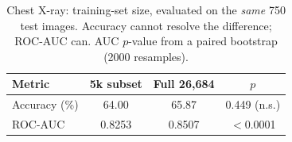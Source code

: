 \begin{table}[t]
\centering
\caption{Chest X-ray: training-set size, evaluated on the \emph{same} 750 test images. Accuracy cannot resolve the difference; ROC-AUC can. AUC $p$-value from a paired bootstrap (2000 resamples).}
\label{tab:chest_xray}
\begin{tabular}{lccc}
\toprule
Metric & 5k subset & Full 26{,}684 & $p$ \\
\midrule
Accuracy (\%) & 64.00 & 65.87 & 0.449 (n.s.) \\
ROC-AUC & 0.8253 & 0.8507 & $<$0.0001 \\
\bottomrule
\end{tabular}
\end{table}
